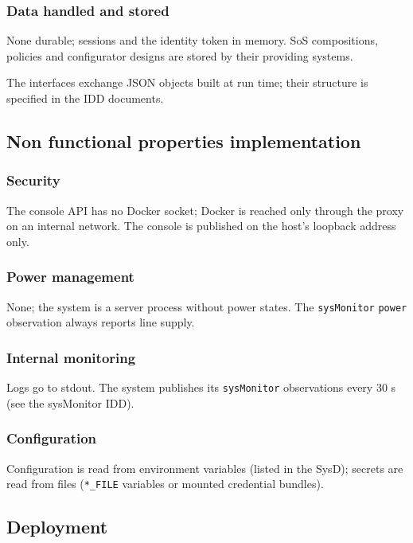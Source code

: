 \documentclass[a4paper]{arrowhead}
\begin{document}
\subsubsection{Data handled and stored}

None durable; sessions and the identity token in memory. SoS compositions, policies and configurator designs are stored by their providing systems.

The interfaces exchange JSON objects built at run time; their structure is specified in the IDD documents.

\subsection{Non functional properties implementation}

\subsubsection{Security}

The console API has no Docker socket; Docker is reached only through the proxy on an internal network. The console is published on the host's loopback address only.

\subsubsection{Power management}

None; the system is a server process without power states. The \texttt{sysMonitor} \texttt{power} observation always reports line supply.

\subsubsection{Internal monitoring}

Logs go to stdout. The system publishes its \texttt{sysMonitor} observations every 30 s (see the sysMonitor IDD).

\subsubsection{Configuration}

Configuration is read from environment variables (listed in the SysD); secrets are read from files (\texttt{*\_\allowbreak{}FILE} variables or mounted credential bundles).

\subsection{Deployment}
\end{document}
